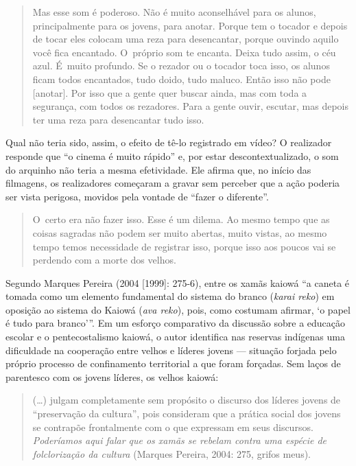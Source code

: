 \begin{quote}
Mas esse som é poderoso. Não é muito aconselhável para os alunos,
principalmente para os jovens, para anotar. Porque tem o tocador e
depois de tocar eles colocam uma reza para desencantar, porque ouvindo
aquilo você fica encantado. O~próprio som te encanta. Deixa tudo assim,
o céu azul. É~muito profundo. Se o rezador ou o tocador toca isso, os
alunos ficam todos encantados, tudo doido, tudo maluco. Então isso não
pode [anotar]. Por isso que a gente quer buscar ainda, mas com toda a
segurança, com todos os rezadores. Para a gente ouvir, escutar, mas
depois ter uma reza para desencantar tudo isso.
\end{quote}

Qual não teria sido, assim, o efeito de tê-lo registrado em vídeo? O
realizador responde que ``o cinema é muito rápido'' e, por estar
descontextualizado, o som do arquinho não teria a mesma efetividade.
Ele afirma que, no início das filmagens, os realizadores começaram a
gravar sem perceber que a ação poderia ser vista perigosa, movidos pela
vontade de ``fazer o diferente''.

\begin{quote}
O~certo era não fazer isso. Esse é um dilema. Ao mesmo tempo que as
coisas sagradas não podem ser muito abertas, muito vistas, ao mesmo
tempo temos necessidade de registrar isso, porque isso aos poucos vai
se perdendo com a morte dos velhos.
\end{quote}

Segundo Marques Pereira (2004 [1999]: 275-6), entre os xamãs kaiowá ``a
caneta é tomada como um elemento fundamental do sistema do branco
(\emph{karai reko}) em oposição ao sistema do Kaiowá (\emph{ava reko}), pois, como
costumam afirmar, ‘o papel é tudo para branco’''. Em um esforço
comparativo da discussão sobre a educação escolar e o pentecostalismo
kaiowá, o autor identifica nas reservas indígenas uma dificuldade na
cooperação entre velhos e líderes jovens --- situação forjada pelo
próprio processo de confinamento territorial a que foram forçadas. Sem
laços de parentesco com os jovens líderes, os velhos kaiowá:

\begin{quote}
(\ldots{}) julgam completamente sem propósito o discurso dos líderes jovens
de ``preservação da cultura'', pois
consideram que a prática social dos jovens se contrapõe frontalmente
com o que expressam em seus discursos. \emph{Poderíamos aqui falar que os
xamãs se rebelam contra uma espécie de folclorização da cultura}
(Marques Pereira, 2004: 275, grifos meus).
\end{quote}

